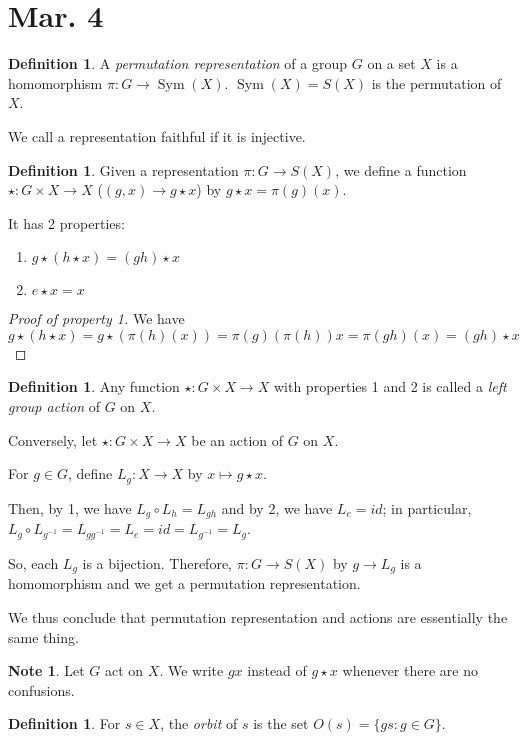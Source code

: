 \documentclass{amsart}
\theoremstyle{definition}
\newtheorem{definition}[thm]{Definition}
\newtheorem{note}[thm]{Note}
\DeclareMathOperator{\Sym}{Sym}
\begin{document}
\section{Mar. 4}
\begin{definition}
	A \emph{permutation representation} of a group $G$ on a set $X$ is a homomorphism $\pi:G\to \Sym(X)$. $\Sym(X)=S(X)$ is the permutation of $X$. 
	
	We call a representation faithful if it is injective.
\end{definition}
\begin{definition}
	Given a representation $\pi:G\to S(X)$, we define a function $\star:G\times X\to X$ ($(g,x)\to g\star x$) by $g\star x=\pi(g)(x)$.
	
	It has 2 properties:
	\begin{enumerate}
		\item $g\star(h\star x)=(gh)\star x$	
		\item $e\star x=x$
	\end{enumerate}
\end{definition}
\begin{proof}[Proof of property 1]
	We have $$g\star(h\star x)=g\star(\pi(h)(x))=\pi(g)(\pi(h))x=\pi(gh)(x)=(gh)\star x$$
\end{proof}
\begin{definition}
	Any function $\star:G\times X\to X$ with properties 1 and 2 is called a \emph{left group action} of $G$ on $X$.
\end{definition}

Conversely, let $\star:G\times X\to X$ be an action of $G$ on $X$.

For $g\in G$, define $L_g:X\to X$ by $x\mapsto g\star x$.

Then, by 1, we have $L_g\circ L_h=L_{gh}$ and by 2, we have $L_e=id$; in particular, $L_g\circ L_{g^{-1}}=L_{gg^{-1}}=L_e=id=L_{g^{-1}}=L_g$.

So, each $L_g$ is a bijection. Therefore, $\pi:G\to S(X)$ by $g\to L_g$ is a homomorphism and we get a permutation representation.

We thus conclude that permutation representation and actions are essentially the same thing.
\begin{note}
	Let $G$ act on $X$. We write $gx$ instead of $g\star x$ whenever there are no confusions.
\end{note}
\begin{definition}
	For $s\in X$, the \emph{orbit} of $s$ is the set $O(s)=\{gs:g\in G\}$.
\end{definition}
\end{document}
